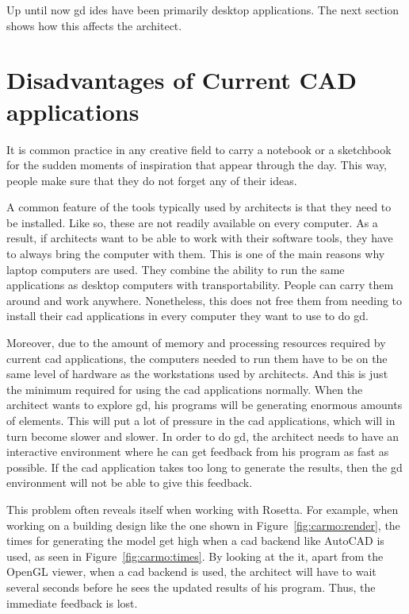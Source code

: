 Up until now \gls{gd} \glspl{ide} have been primarily desktop applications.
The next section shows how this affects the architect.


\section{Disadvantages of Current CAD applications}
It is common practice in any creative field to carry a notebook or a sketchbook for the sudden moments of inspiration that appear through the day.
This way, people make sure that they do not forget any of their ideas.

A common feature of the tools typically used by architects is that they need to be installed.
Like so, these are not readily available on every computer.
As a result, if architects want to be able to work with their software tools, they have to always bring the computer with them.
This is one of the main reasons why laptop computers are used.
They combine the ability to run the same applications as desktop computers with transportability.
People can carry them around and work anywhere.
Nonetheless, this does not free them from needing to install their \gls{cad} applications in every computer they want to use to do \gls{gd}.

Moreover, due to the amount of memory and processing resources required by current \gls{cad} applications, the computers needed to run them have to be on the same level of hardware as the workstations used by architects.
And this is just the minimum required for using the \gls{cad} applications normally.
When the architect wants to explore \gls{gd}, his programs will be generating enormous amounts of elements.
This will put a lot of pressure in the \gls{cad} applications, which will in turn become slower and slower.
In order to do \gls{gd}, the architect needs to have an interactive environment where he can get feedback from his program as fast as possible.
If the \gls{cad} application takes too long to generate the results, then the \gls{gd} environment will not be able to give this feedback.

This problem often reveals itself when working with Rosetta.
For example, when working on a building design like the one shown in Figure~\ref{fig:carmo:render}, the times for generating the model get high when a \gls{cad} backend like AutoCAD is used, as seen in Figure~\ref{fig:carmo:times}.
By looking at the it, apart from the OpenGL viewer, when a \gls{cad} backend is used, the architect will have to wait several seconds before he sees the updated results of his program.
Thus, the immediate feedback is lost.

